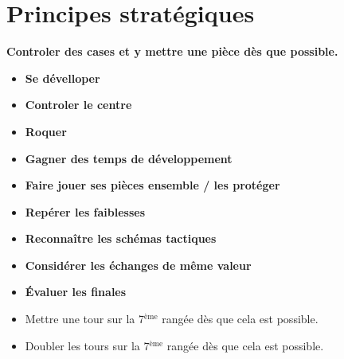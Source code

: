 \chapter{Principes stratégiques}


{\bf Controler des cases et y mettre une pièce dès que possible.}


\begin{itemize}[leftmargin=2.7cm, label=, itemsep=0pt]%
\item  {\bf Se dévelloper}
\item  {\bf Controler le centre}
\item  {\bf Roquer}
\end{itemize}

\begin{itemize}[leftmargin=2.7cm, label=, itemsep=0pt]%
\item  {\bf Gagner des  temps de développement}
\item  {\bf Faire jouer ses pièces ensemble / les protéger}
\end{itemize}

\begin{itemize}[leftmargin=2.7cm, label=, itemsep=0pt]%
\item  {\bf Repérer les faiblesses}
\item  {\bf Reconnaître les schémas tactiques}
\item  {\bf Considérer les échanges de même valeur}
\item  {\bf Évaluer les finales}
\end{itemize}

\begin{itemize}[leftmargin=1.7cm, label=, itemsep=0pt]%
\item  Mettre une tour sur la 7$^\text{ème}$ rangée dès que cela est possible.
\item  Doubler les tours sur la 7$^\text{ème}$ rangée dès que cela est possible.
\end{itemize}


